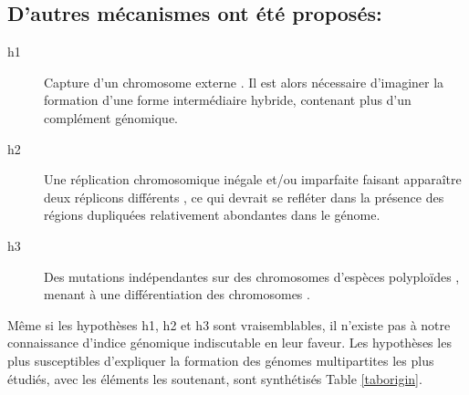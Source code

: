 \subsection*{D'autres mécanismes ont été proposés:}
	 \begin{description}
	 \item[h1] Capture d'un chromosome externe \citep{Moreno1998,Mackenzie2004}. Il est alors nécessaire d'imaginer la formation d'une forme intermédiaire hybride, contenant plus d'un complément génomique.
	 \item[h2] Une réplication chromosomique inégale et/ou imparfaite faisant apparaître deux réplicons différents \citep{Moreno1998}, ce qui devrait se refléter dans la présence des régions dupliquées relativement abondantes dans le génome.
	 \item[h3]  Des mutations indépendantes sur des chromosomes d'espèces polyploïdes \citep{Moreno1998}, menant à une différentiation des chromosomes .
\end{description}

Même si les hypothèses h1, h2 et h3 sont vraisemblables, il n'existe pas à notre connaissance d'indice génomique indiscutable en leur faveur. Les hypothèses les plus susceptibles d'expliquer la formation des génomes multipartites les plus étudiés, avec les éléments les soutenant, sont synthétisés Table \ref{taborigin}.

\newpage


